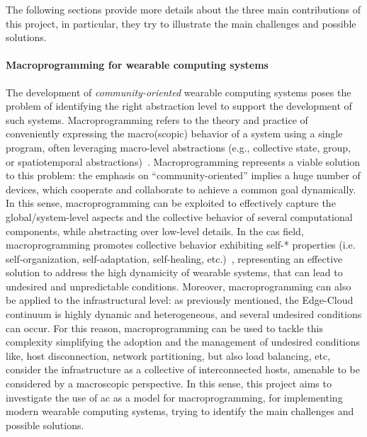 \documentclass[12pt,a4paper]{article}
\begin{document}
The following sections provide more details about the three main contributions of this project,
in particular,
they try to illustrate the main challenges and possible solutions.

\paragraph{Macroprogramming for wearable computing systems}\label{sec:macro-prog}
The development of \emph{community-oriented} wearable computing systems poses the problem of identifying the right abstraction level to support the development of such systems.
%
Macroprogramming refers to the theory and practice of conveniently expressing the macro(scopic) behavior of a system using a single program, often leveraging macro-level abstractions (e.g., collective state, group, or spatiotemporal abstractions)~\cite{DBLP:journals/corr/abs-2201-03473}.
%
Macroprogramming represents a viable solution to this problem:
the emphasis on ``community-oriented'' implies a huge number of devices,
which cooperate and collaborate to achieve a common goal dynamically.
%
In this sense,
macroprogramming can be exploited to effectively capture the global/system-level aspects and the collective behavior of several computational components,
while abstracting over low-level details.
%
In the \ac{cas} field,
macroprogramming promotes collective behavior exhibiting self-* properties (i.e. self-organization, self-adaptation, self-healing, etc.)~\cite{DBLP:conf/dagstuhl/LemosGMSABBBBCD10, DBLP:journals/computer/KephartC03},
representing an effective solution to address the high dynamicity of wearable systems,
that can lead to undesired and unpredictable conditions.
%
Moreover,
macroprogramming can also be applied to the infrastructural level: as previously mentioned, the Edge-Cloud continuum is highly dynamic and heterogeneous,
and several undesired conditions can occur.
%
For this reason,
macroprogramming can be used to tackle this complexity simplifying the adoption and the management of undesired conditions like,
host disconnection, network partitioning, but also load balancing, etc,
consider the infrastructure as a collective of interconnected hosts, amenable to be considered by a macroscopic perspective.
%
In this sense,
this project aims to investigate the use of \ac{ac} as a model for macroprogramming,
for implementing modern wearable computing systems,
trying to identify the main challenges and possible solutions.
\end{document}
